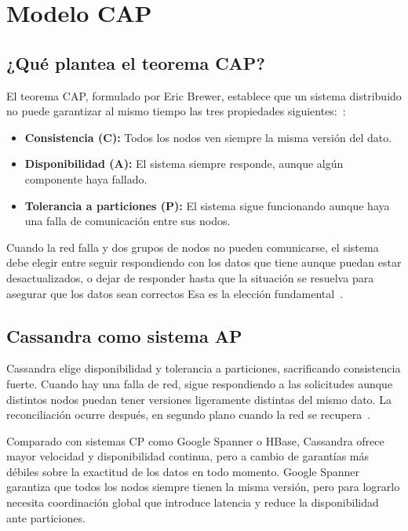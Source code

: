 \documentclass[12pt, a4paper]{article}
\begin{document}
\section{Modelo CAP}

\subsection{¿Qué plantea el teorema CAP?}
El teorema CAP, formulado por Eric Brewer, establece que un sistema distribuido no puede garantizar al mismo tiempo las tres propiedades siguientes:~\cite{brewer2012}:

\begin{itemize}[noitemsep]
  \item \textbf{Consistencia (C):} Todos los nodos ven siempre la misma versión del dato.
  \item \textbf{Disponibilidad (A):} El sistema siempre responde, aunque algún componente haya fallado.
  \item \textbf{Tolerancia a particiones (P):} El sistema sigue funcionando aunque haya una falla de comunicación entre sus nodos.
\end{itemize}

Cuando la red falla y dos grupos de nodos no pueden comunicarse, el sistema debe elegir entre seguir respondiendo con los datos que tiene aunque puedan estar desactualizados, o dejar de responder hasta que la situación se resuelva para asegurar que los datos sean correctos Esa es la elección fundamental~\cite{brewer2012}.

\subsection{Cassandra como sistema AP}

Cassandra elige disponibilidad y tolerancia a particiones,
sacrificando consistencia fuerte. Cuando hay una falla de red, sigue respondiendo a las solicitudes aunque distintos nodos puedan tener versiones ligeramente distintas del mismo dato. La reconciliación ocurre después, en segundo plano cuando la red se recupera~\cite{lakshman2010}.

Comparado con sistemas CP como Google Spanner o HBase, Cassandra
ofrece mayor velocidad y disponibilidad continua, pero a cambio de
garantías más débiles sobre la exactitud de los datos en todo momento.
Google Spanner garantiza que todos los nodos siempre tienen la misma versión,
pero para lograrlo necesita coordinación global que introduce latencia
y reduce la disponibilidad ante particiones.
\end{document}
